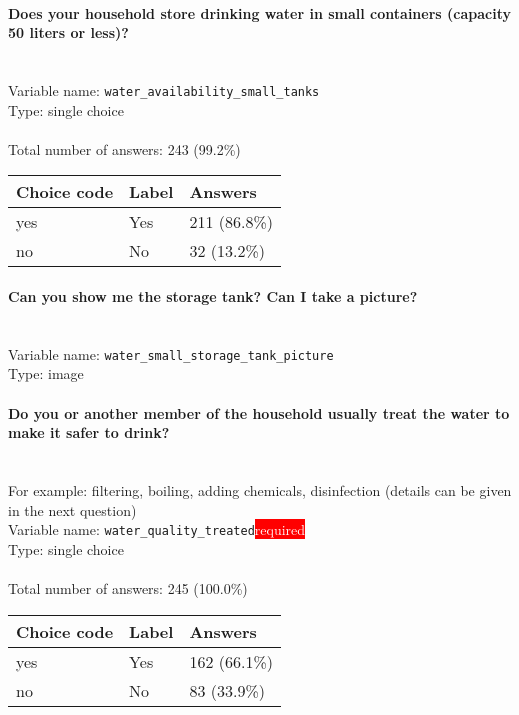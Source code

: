 \documentclass[11.5pt, a4paper]{scrartcl}
\begin{document}
\paragraph{Does your household store drinking water in small containers (capacity 50 liters or less)? }
\  \\Variable name: \texttt{water\_availability\_small\_tanks}\\
Type: single choice\\
\\Total number of answers: 243 (99.2\%)
\\[0.2em] \begin{tabular}{p{4cm}|p{8cm}|p{3cm}}
Choice code & Label & Answers \\
\hline
yes & Yes& \cellcolor{color4}211 (86.8\%)\\
\cellcolor{mygray} no & \cellcolor{mygray}No & \cellcolor{color0}32 (13.2\%)\\
\end{tabular}
\paragraph{Can you show me the storage tank? Can I take a picture?}
\  \\Variable name: \texttt{water\_small\_storage\_tank\_picture}\\
Type: image\\
\paragraph{Do you or another member of the household usually treat the water to make it safer to drink? }
\ \\ {\small For example: filtering, boiling, adding chemicals, disinfection (details can be given in the next question)}
\  \\Variable name: \texttt{water\_quality\_treated}\hfill\colorbox{red}{\small{\textcolor{white}{required}}}\\
 Type: single choice\\
\\Total number of answers: 245 (100.0\%)
\\[0.2em] \begin{tabular}{p{4cm}|p{8cm}|p{3cm}}
Choice code & Label & Answers \\
\hline
yes & Yes& \cellcolor{color3}162 (66.1\%)\\
\cellcolor{mygray} no & \cellcolor{mygray}No & \cellcolor{color1}83 (33.9\%)\\
\end{tabular}
\end{document}
